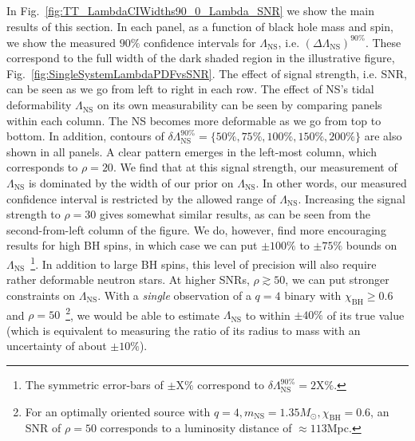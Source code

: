 \documentclass[aps,prd,amsmath,floats,floatfix, twocolumn,
superscriptaddress,nofootinbib,showpacs]{revtex4-1}
\newcommand{\lambdans}{\Lambda_\mathrm{NS}}
\newcommand{\dlambda}{\delta\lambdans^{90\%}}
\newcommand{\chibh}{\chi_\mathrm{BH}}
\newcommand{\mns}{m_\mathrm{NS}}
\begin{document}
In Fig.~\ref{fig:TT_LambdaCIWidths90_0_Lambda_SNR} we show the main results
of this section. In each panel, as a function of black hole mass and spin,
we show the measured $90\%$ confidence intervals for $\lambdans$, i.e.
$(\Delta\lambdans)^{90\%}$. These correspond to the full width of the dark
shaded region in the illustrative figure,
Fig.~\ref{fig:SingleSystemLambdaPDFvsSNR}. The effect of signal strength,
i.e. SNR, can be seen as we go from left to right in each row. The
effect of NS's tidal deformability $\lambdans$ on its own measurability
can be seen by comparing panels within each column. The NS becomes more 
deformable as we go from top to bottom. In addition, contours of
$\dlambda=\{50\%,75\%,100\%,150\%,200\%\}$ are also shown in all panels.
%
A clear pattern emerges in the left-most column, which corresponds to
$\rho=20$. We find that at this signal strength, our measurement of 
$\lambdans$ is dominated by the width of our prior on $\lambdans$. In other
words, our measured confidence interval is restricted by the
allowed range of $\lambdans$. Increasing the signal strength to
$\rho=30$ gives somewhat similar results, as can be seen from the second-from-left
column of the figure. We do, however, find more encouraging results
for high BH spins, in which case we can put $\pm 100\%$ to $\pm 75\%$
bounds on $\lambdans$~\footnote{The symmetric error-bars of
$\pm\mathrm{X}\%$ correspond to $\dlambda = 2\mathrm{X}\%$.}.
In addition to large BH spins, this level of
precision will also require rather deformable neutron stars.
%
At higher SNRs, $\rho\gtrsim 50$, we can put stronger constraints
on $\lambdans$. With a {\it single} observation of a $q=4$ binary with
$\chibh\geq 0.6$ and $\rho = 50$~\footnote{For an optimally oriented
source with $q=4, \mns=1.35M_\odot, \chibh=0.6$, an SNR of 
$\rho = 50$ corresponds to a luminosity distance of $\approx 113$Mpc.},
we would be able to estimate 
$\lambdans$ to within $\pm 40\%$ of its true value 
(which is equivalent to measuring the ratio of its radius to mass
with an uncertainty of about $\pm 10\%$).
\end{document}
